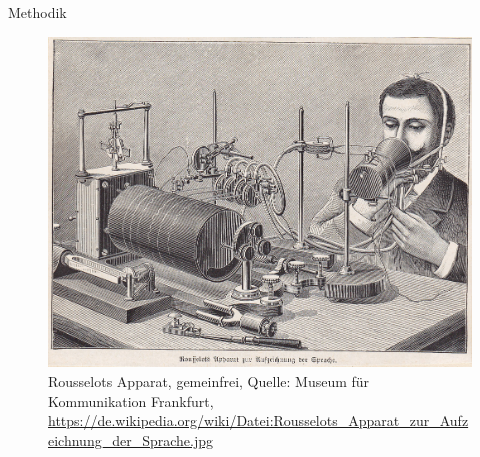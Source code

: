\begin{frame}{Methodik}

	\begin{figure}
		\centering
		
		\includegraphics[scale=0.1]{material/04RousselotsApparatzurAufzeichnungderSprache}
		\caption{Rousselots Apparat, gemeinfrei, Quelle: Museum für Kommunikation Frankfurt, \url{https://de.wikipedia.org/wiki/Datei:Rousselots_Apparat_zur_Aufzeichnung_der_Sprache.jpg}}
	\end{figure}
	
\end{frame}




		
	



